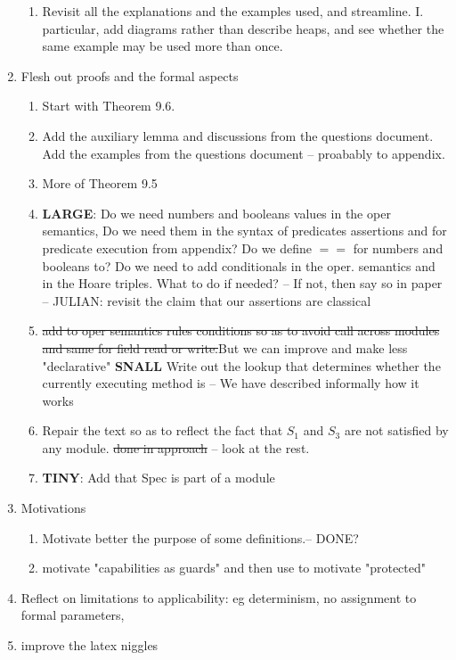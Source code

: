 \documentclass[acmsmall,review,anonymous]{acmart}\settopmatter{printfolios=true}
\begin{document}
\begin{enumerate}
\begin{enumerate}
\item
Revisit all the explanations and the examples used, and streamline. I. particular, add diagrams rather than describe heaps, and see whether the same example may be used more than once.
\end{enumerate}

\item
Flesh out  proofs and the formal aspects
\begin{enumerate}
\item
Start with Theorem 9.6.  

\item
Add the auxiliary lemma and discussions from the questions document. Add the examples from the questions document -- proabably to appendix. 

\item
More of Theorem 9.5

\item
\textbf{LARGE}: Do we need numbers and booleans values in the oper semantics, 
Do we need them in the syntax of predicates assertions and for predicate execution from appendix?
Do we define $==$ for numbers and booleans to?  
Do we need to add conditionals in the oper. semantics and in the Hoare triples. What to do if needed?
--
If not, then say so in paper
--
JULIAN: revisit the claim that our assertions are classical

\item
\st{add to oper semantics rules conditions so as to avoid call across modules and same for field read or write.}But we can improve and make less "declarative" {\textbf{SNALL}} Write out the lookup that determines  whether the currently executing  method is  -- We have described informally how it works


\item
Repair the text so as to reflect the fact that $S_1$ and $S_3$ are not satisfied by any module. {\st{done in approach}} -- look at the rest.

\item
\textbf{TINY}:  Add that Spec is part of a module

 \end{enumerate}

\item
Motivations 

\begin{enumerate}
\item
Motivate better the purpose of some definitions.-- 
DONE? 
\item
motivate "capabilities as guards" and then use to motivate "protected"
\end{enumerate}
 
\item
Reflect on limitations to applicability: eg determinism, no assignment to formal parameters, 



\item
improve the latex niggles 
 


\end{enumerate}
\end{document}
